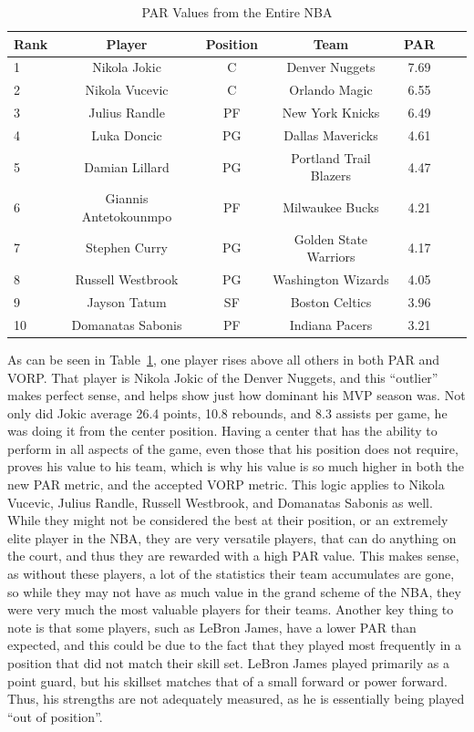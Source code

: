 \documentclass[titlepage, 12pt]{article}
\begin{document}
\begin{table}[tbp]
  \caption{PAR Values from the Entire NBA}
  \label{tab:NBAtable}
\centering
\begin{tabular}[t]{lcccccc}
  \toprule
  Rank & Player & Position & Team & PAR\\
  \midrule
 1 & Nikola Jokic & C & Denver Nuggets & 7.69\\
 2 & Nikola Vucevic & C & Orlando Magic & 6.55\\
 3 & Julius Randle & PF & New York Knicks & 6.49\\
 4 & Luka Doncic & PG & Dallas Mavericks & 4.61\\
 5 & Damian Lillard & PG & Portland Trail Blazers & 4.47\\
 6 & Giannis Antetokounmpo & PF & Milwaukee Bucks & 4.21\\
 7 & Stephen Curry & PG & Golden State Warriors & 4.17\\
 8 & Russell Westbrook & PG & Washington Wizards & 4.05\\
 9 & Jayson Tatum & SF & Boston Celtics & 3.96\\
 10 & Domanatas Sabonis & PF & Indiana Pacers & 3.21\\
 \bottomrule
\end{tabular}
\end{table}

As can be seen in Table~\ref{tab:NBAtable}, one player rises above all 
others in 
both PAR and VORP. 
That player is Nikola Jokic of the 
Denver Nuggets, and this ``outlier'' makes perfect sense, and helps show 
just how dominant his MVP 
season was. Not only did Jokic average 26.4 points, 10.8 rebounds, and 
8.3 assists per game, he was 
doing it from the center position. Having a center that has the ability to 
perform in all aspects of the game, 
even those that his position does not require, proves his value to his 
team, which is why his value is so 
much higher in both the new PAR metric, and the accepted VORP metric. 
This logic applies to Nikola 
Vucevic, Julius Randle, Russell Westbrook, and Domanatas Sabonis as 
well. While they might not be 
considered the best at their position, or an extremely elite player in the 
NBA, they are very versatile players, 
that can do anything on the court, and thus they are rewarded with a high 
PAR value. This makes sense, as 
without these players, a lot of the statistics their team accumulates are 
gone, so while they may not have as 
much value in the grand scheme of the NBA, they were very much the 
most valuable players for their 
teams. Another key thing to note is that some players, such as LeBron 
James, have a lower PAR than 
expected, and this could be due to the fact that they played most 
frequently in a position that did not match 
their skill set. LeBron James played primarily as a point guard, but his 
skillset matches that of a small 
forward or power forward. Thus, his strengths are not adequately 
measured, as he is essentially being 
played ``out of position''.
\end{document}
